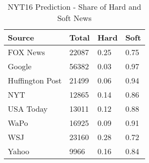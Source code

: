 \begin{table}[t]

\caption{\label{tab:tab:nyt16_pred_hard_soft}NYT16 Prediction - Share of Hard and Soft News}
\centering
\begin{tabular}{llll}
\toprule
Source & Total & Hard & Soft\\
\midrule
FOX News & 22087 & 0.25 & 0.75\\
Google & 56382 & 0.03 & 0.97\\
Huffington Post & 21499 & 0.06 & 0.94\\
NYT & 12865 & 0.14 & 0.86\\
USA Today & 13011 & 0.12 & 0.88\\
\addlinespace
WaPo & 16925 & 0.09 & 0.91\\
WSJ & 23160 & 0.28 & 0.72\\
Yahoo & 9966 & 0.16 & 0.84\\
\bottomrule
\end{tabular}
\end{table}

